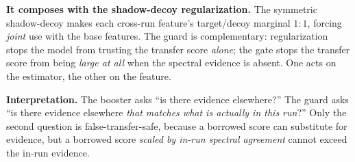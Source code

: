 \documentclass[11pt]{article}
\begin{document}
\textbf{It composes with the shadow-decoy regularization.} The symmetric shadow-decoy makes each
cross-run feature's target/decoy marginal $1{:}1$, forcing \emph{joint} use with the base features.
The guard is complementary: regularization stops the model from trusting the transfer score
\emph{alone}; the gate stops the transfer score from being \emph{large at all} when the spectral
evidence is absent. One acts on the estimator, the other on the feature.

\textbf{Interpretation.} The booster asks ``is there evidence elsewhere?'' The guard asks ``is there
evidence elsewhere \emph{that matches what is actually in this run}?'' Only the second question is
false-transfer-safe, because a borrowed score can substitute for evidence, but a borrowed score
\emph{scaled by in-run spectral agreement} cannot exceed the in-run evidence.
\end{document}
